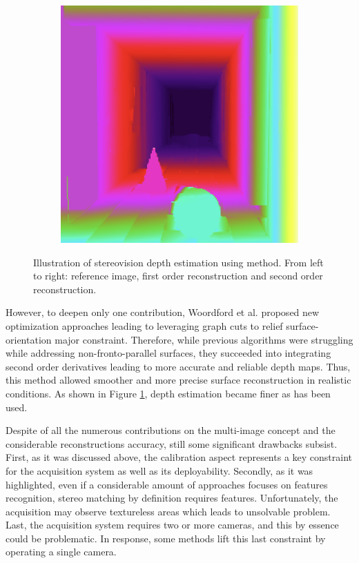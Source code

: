 \begin{figure}[h]
\begin{subfigure}{.3\textwidth}
		\centering
		\includegraphics[width=\linewidth]{Figures/SOA/wood3.png}
	\end{subfigure}
	\caption[Illustration of stereovision depth estimation using Woordfor et al. method.]{Illustration of stereovision depth estimation using \cite{Woodford2008GlobalPriors} method. From left to right: reference image, first order reconstruction and second order reconstruction.}
	\label{illu-wood}
\end{figure}

However, to deepen only one contribution, Woordford et al. \cite{Woodford2008GlobalPriors} proposed new optimization approaches leading to leveraging graph cuts to relief surface-orientation major constraint. Therefore, while previous algorithms were struggling while addressing non-fronto-parallel surfaces, they succeeded into integrating second order derivatives leading to more accurate and reliable depth maps. Thus, this method allowed smoother and more precise surface reconstruction in realistic conditions. As shown in Figure \ref{illu-wood}, depth estimation became finer as \cite{Woodford2008GlobalPriors} has been used.

Despite of all the numerous contributions on the multi-image concept and the considerable reconstructions accuracy, still some significant drawbacks subsist. First, as it was discussed above, the calibration aspect represents a key constraint for the acquisition system as well as its deployability. Secondly, as it was highlighted, even if a considerable amount of approaches focuses on features recognition, stereo matching by definition requires features. Unfortunately, the acquisition may observe textureless areas which leads to unsolvable problem. 
Last, the acquisition system requires two or more cameras, and this by essence could be problematic. In response, some methods lift this last constraint by operating a single camera.

